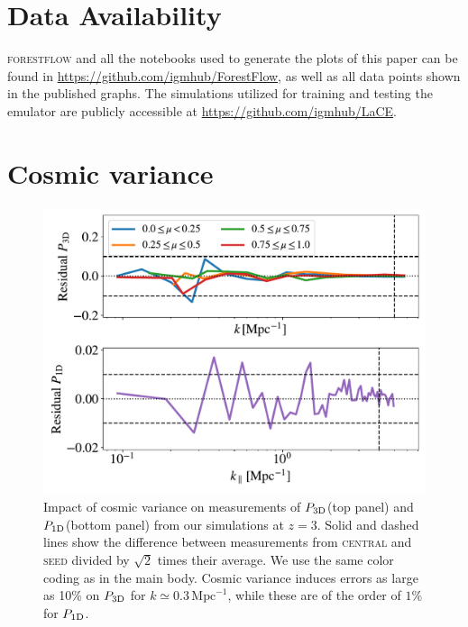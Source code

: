 \documentclass[fleqn,usenatbib]{mnras}
\newcommand{\poned}{\ensuremath{P_{\rm 1D}}\xspace}
\newcommand{\pthreed}{\ensuremath{P_{\rm 3D}}\xspace}
\newcommand{\forestflow}{\textsc{forestflow}\xspace}
\newcommand{\simseed}{\textsc{seed}\xspace}
\newcommand{\simcentral}{\textsc{central}\xspace}
\newcommand{\iMpc}{\ensuremath{\,\mathrm{Mpc}^{-1}}}
\begin{document}
\section*{Data Availability}

\forestflow and all the notebooks used to generate the plots of this paper can be found in \url{https://github.com/igmhub/ForestFlow}, as well as all data points shown in the published graphs. The simulations utilized for training and testing the emulator are publicly accessible at \url{https://github.com/igmhub/LaCE}.






\appendix



\section{Cosmic variance}
\label{sec:cosmic_variance}

\begin{figure}
    \centering\includegraphics[width=\columnwidth]{figures/cvariance_z_3.0.pdf}
    \caption{Impact of cosmic variance on measurements of \pthreed (top panel) and \poned (bottom panel) from our simulations at $z=3$. Solid and dashed lines show the difference between measurements from \simcentral and \simseed divided by $\sqrt{2}$ times their average. We use the same color coding as in the main body. Cosmic variance induces errors as large as 10\% on \pthreed for $k\simeq0.3\iMpc$, while these are of the order of $1\%$ for \poned.}
    \label{fig:cvar}
\end{figure}
\end{document}
